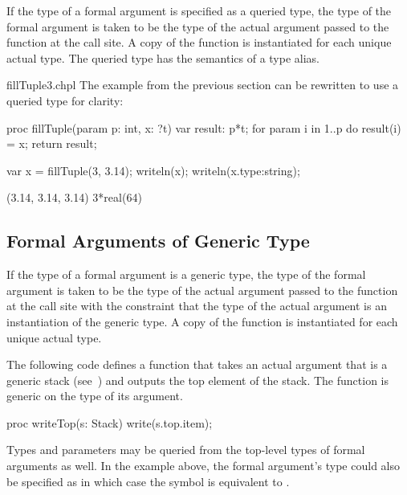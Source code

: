 If the type of a formal argument is specified as a queried type, the
type of the formal argument is taken to be the type of the actual
argument passed to the function at the call site.  A copy of the
function is instantiated for each unique actual type.  The queried
type has the semantics of a type alias.
\begin{chapelexample}{fillTuple3.chpl}
The example from the previous section can be rewritten to use a
queried type for clarity:
\begin{chapel}
proc fillTuple(param p: int, x: ?t) {
  var result: p*t;
  for param i in 1..p do
    result(i) = x;
  return result;
}
\end{chapel}
\begin{chapelpost}
var x = fillTuple(3, 3.14);
writeln(x);
writeln(x.type:string);
\end{chapelpost}
\begin{chapeloutput}
(3.14, 3.14, 3.14)
3*real(64)
\end{chapeloutput}
\end{chapelexample}

\subsection{Formal Arguments of Generic Type}
\label{Formal_Arguments_of_Generic_Type}

If the type of a formal argument is a generic type, the type of the
formal argument is taken to be the type of the actual argument passed
to the function at the call site with the constraint that the type of
the actual argument is an instantiation of the generic type. A copy
of the function is instantiated for each unique actual type.
\begin{example}
The following code defines a function  that takes an
actual argument that is a generic stack
(see~) and outputs the top element of the
stack.  The function is generic on the type of its argument.
\begin{chapel}
proc writeTop(s: Stack) {
  write(s.top.item);
}
\end{chapel}
\end{example}

Types and parameters may be queried from the top-level types of formal
arguments as well.  In the example above, the formal argument's type
could also be specified as  in which case the
symbol  is equivalent to .

